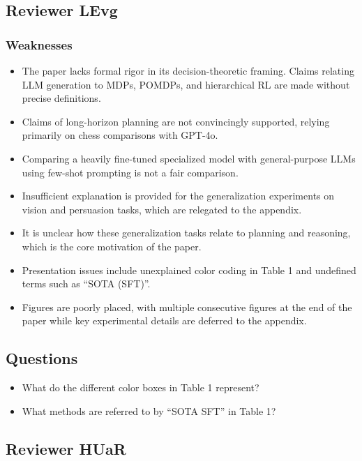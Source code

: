 \subsection*{Reviewer LEvg}

\subsubsection*{Weaknesses}

\begin{itemize}
    \item The paper lacks formal rigor in its decision-theoretic framing. Claims relating LLM generation to MDPs, POMDPs, and hierarchical RL are made without precise definitions.
    \item Claims of long-horizon planning are not convincingly supported, relying primarily on chess comparisons with GPT-4o.
    \item Comparing a heavily fine-tuned specialized model with general-purpose LLMs using few-shot prompting is not a fair comparison.
    \item Insufficient explanation is provided for the generalization experiments on vision and persuasion tasks, which are relegated to the appendix.
    \item It is unclear how these generalization tasks relate to planning and reasoning, which is the core motivation of the paper.
    \item Presentation issues include unexplained color coding in Table 1 and undefined terms such as ``SOTA (SFT)''.
    \item Figures are poorly placed, with multiple consecutive figures at the end of the paper while key experimental details are deferred to the appendix.
\end{itemize}

\subsection*{Questions}

\begin{itemize}
    \item What do the different color boxes in Table 1 represent?
    \item What methods are referred to by ``SOTA SFT'' in Table 1?
\end{itemize}


\subsection*{Reviewer HUaR}

